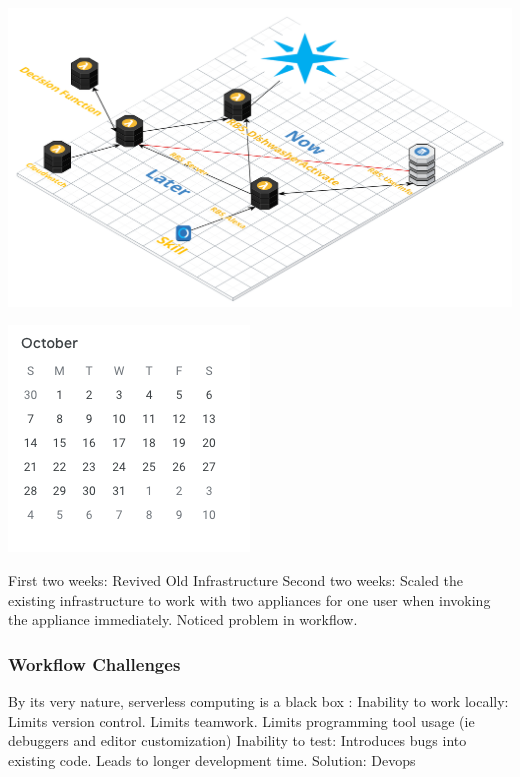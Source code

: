 \documentclass{beamer}
\begin{document}
\begin{frame}
    \includegraphics[width=\paperwidth,height=\paperheight,keepaspectratio]{pictures/architecture}
\end{frame}

\begin{frame}
    \includegraphics[width=0.5\paperwidth,height=0.5\paperheight,keepaspectratio]{pictures/october}
    \begin{outline}
         First two weeks:
         Revived Old Infrastructure
         Second two weeks:
         Scaled the existing infrastructure to work with two appliances for one user
        when invoking the appliance immediately.
         Noticed problem in workflow.
    \end{outline}
\end{frame}

\begin{frame}
    \frametitle{Workflow Challenges}
    \begin{outline}
         By its very nature, serverless computing is a black box \cite{Baldini2017}:
         Inability to work locally:
         Limits version control.
         Limits teamwork.
         Limits programming tool usage (ie debuggers and editor customization)
         Inability to test:
         Introduces bugs into existing code.
         Leads to longer development time.
         Solution: Devops 
    \end{outline}
\end{frame}
\end{document}
